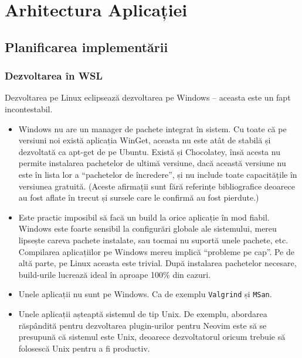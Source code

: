 \documentclass[a4paper,12pt]{report}
\begin{document}

\chapter{Arhitectura Aplicației}\label{architecture_chapter_title}



\section{Planificarea implementării}

\subsection{Dezvoltarea în \ac{WSL}}

Dezvoltarea pe Linux eclipsează dezvoltarea pe Windows -- aceasta este un fapt incontestabil.
\begin{itemize}
    \item 
        Windows nu are un manager de pachete integrat în sistem.
        Cu toate că pe versiuni noi există aplicația WinGet, 
        aceasta nu este atât de stabilă și dezvoltată ca apt-get de pe Ubuntu.
        Există și Chocolatey, însă acesta nu permite instalarea pachetelor de ultimă versiune,
        dacă această versiune nu este în lista lor a ``pachetelor de încredere'',
        și nu include toate capacitățile în versiunea gratuită.
        (Aceste afirmații sunt fără referințe bibliografice deoarece 
        au fost aflate în trecut și sursele care le confirmă au fost pierdute.)

    \item
        Este practic imposibil să facă un build la orice aplicație în mod fiabil.
        Windows este foarte sensibil la configurări globale ale sistemului,
        mereu lipsește careva pachete instalate, sau tocmai nu suportă unele pachete, etc.
        Compilarea aplicațiilor pe Windows mereu implică ``probleme pe cap''.
        Pe de altă parte, pe Linux aceasta este trivial.
        După instalarea pachetelor necesare, build-urile lucrează ideal în aproape 100\% din cazuri.

    \item
        Unele aplicații nu sunt pe Windows.
        Ca de exemplu \texttt{Valgrind} și \texttt{MSan}.

    \item
        Unele aplicații așteaptă sistemul de tip Unix.
        De exemplu, abordarea răspândită pentru dezvoltarea plugin-urilor
        pentru Neovim este să se presupună că sistemul este Unix,
        deoarece dezvoltatorul oricum trebuie să folosescă Unix pentru a fi productiv.
\end{itemize}
\end{document}
